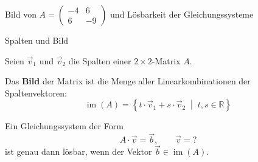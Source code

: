 


\begin{bsp}
    { Bild von  \( A = \begin{pmatrix} -4 & 6 \\ 6 & -9 \end{pmatrix} \) und Lösbarkeit der Gleichungssysteme}{}

    \vspace*{19 cm}
\end{bsp}
\clearpage
\begin{satz}
    {Spalten und Bild}{}
    
Seien \( \vec{v}_1 \) und \( \vec{v}_2 \) die Spalten einer \( 2 \times 2 \)-Matrix \( A \).

\medskip

Das \textbf{Bild} der Matrix ist die Menge aller Linearkombinationen der Spaltenvektoren:
\[
\operatorname{im}(A) = \left\{ t \cdot \vec{v}_1 + s \cdot \vec{v}_2 \;\middle|\; t, s \in \mathbb{R} \right\}
\]

\medskip
Ein Gleichungssystem der Form 
$$ A\cdot \vec{v} = \vec{b}, \qquad \vec{v} =? $$
ist genau dann lösbar, wenn der Vektor \( \vec{b} \in \operatorname{im}(A)  \).



\end{satz}


